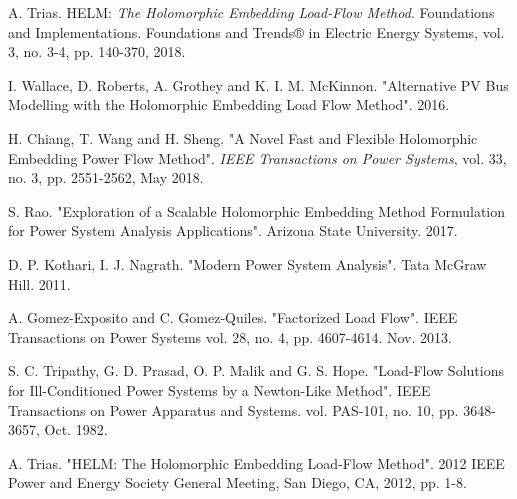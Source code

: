 \documentclass[conference]{IEEEtran}
\begin{document}
\begin{thebibliography}{1}
A. Trias. HELM: \emph{The Holomorphic Embedding Load-Flow Method}. Foundations and Implementations. Foundations and Trends® in Electric Energy Systems, vol. 3, no. 3-4, pp. 140-370, 2018.

I. Wallace, D. Roberts, A. Grothey and K. I. M. McKinnon. "Alternative PV Bus Modelling with the Holomorphic Embedding Load Flow Method". 2016.

H. Chiang, T. Wang and H. Sheng. "A Novel Fast and Flexible Holomorphic Embedding Power Flow Method". \emph{IEEE Transactions on Power Systems}, vol. 33, no. 3, pp. 2551-2562, May 2018.

S. Rao. "Exploration of a Scalable Holomorphic Embedding Method Formulation for Power System Analysis Applications". Arizona State University. 2017.

D. P. Kothari, I. J. Nagrath. "Modern Power System Analysis". Tata McGraw Hill. 2011.

A. Gomez-Exposito and C. Gomez-Quiles. "Factorized Load Flow". IEEE Transactions on Power Systems vol. 28, no. 4, pp. 4607-4614. Nov. 2013.

S. C. Tripathy, G. D. Prasad, O. P. Malik and G. S. Hope. "Load-Flow Solutions for Ill-Conditioned Power Systems by a Newton-Like Method". IEEE Transactions on Power Apparatus and Systems. vol. PAS-101, no. 10, pp. 3648-3657, Oct. 1982.

A. Trias. "HELM: The Holomorphic Embedding Load-Flow Method". 2012 IEEE Power and Energy Society General Meeting, San Diego, CA, 2012, pp. 1-8.


\end{thebibliography}




\end{document}
